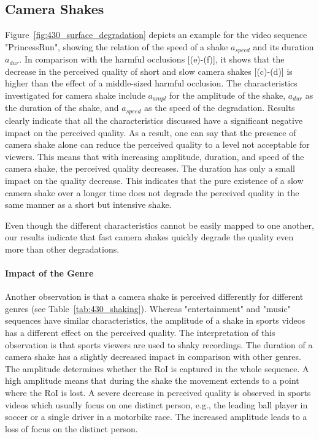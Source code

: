 \subsection{Camera Shakes}
\label{sec:430_results_camera_shakes}
Figure~\ref{fig:430_surface_degradation} depicts an example for the video sequence "PrincessRun", showing the relation of the speed of a shake $a_{speed}$ and its duration $a_{dur}$. 
In comparison with the harmful occlusions [(e)-(f)], it shows that the decrease in the perceived quality of short and slow camera shakes [(c)-(d)] is higher than the effect of a middle-sized harmful occlusion.
The characteristics investigated for camera shake include $a_{ampl}$ for the amplitude of the shake, $a_{dur}$ as the duration of the shake, and $a_{speed}$ as the speed of the degradation. 
Results clearly indicate that all the characteristics discussed have a significant negative impact on the perceived quality.
As a result, one can say that the presence of camera shake alone can reduce the perceived quality to a level not acceptable for viewers.
This means that with increasing amplitude, duration, and speed of the camera shake, the perceived quality decreases. 
The duration has only a small impact on the quality decrease.
This indicates that the pure existence of a slow camera shake over a longer time does not degrade the perceived quality in the same manner as a short but intensive shake.  

Even though the different characteristics cannot be easily mapped to one another, our results indicate that fast camera shakes quickly degrade the quality even more than other degradations.
\paragraph{Impact of the Genre}
Another observation is that a camera shake is perceived differently for different genres (see Table~\ref{tab:430_shaking}). 
Whereas "entertainment" and "music" sequences have similar characteristics, the amplitude of a shake in sports videos has a different effect on the perceived quality. 
The interpretation of this observation is that sports viewers are used to shaky recordings.
The duration of a camera shake has a slightly decreased impact in comparison with other genres.
The amplitude determines whether the \ac{RoI} is captured in the whole sequence.
A high amplitude means that during the shake the movement extends to a point where the \ac{RoI} is lost.
A severe decrease in perceived quality is observed in sports videos which usually focus on one distinct person, e.g., the leading ball player in soccer or a single driver in a motorbike race.
The increased amplitude leads to a loss of focus on the distinct person.

